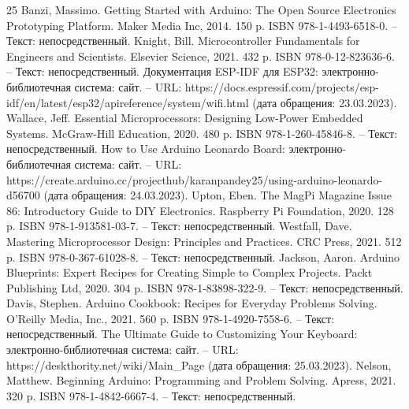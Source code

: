 \begin{thebibliography}{25}
     Banzi, Massimo. Getting Started with Arduino: The Open Source Electronics Prototyping Platform. Maker Media Inc, 2014. 150 p. ISBN 978-1-4493-6518-0. -- Текст: непосредственный.
     Knight, Bill. Microcontroller Fundamentals for Engineers and Scientists. Elsevier Science, 2021. 432 p. ISBN 978-0-12-823636-6. -- Текст: непосредственный.
     Документация ESP-IDF для ESP32: электронно-библиотечная система: сайт. -- URL: https://docs.espressif.com/projects/esp-idf/en/latest/esp32/apireference/system/wifi.html (дата обращения: 23.03.2023).
     Wallace, Jeff. Essential Microprocessors: Designing Low-Power Embedded Systems. McGraw-Hill Education, 2020. 480 p. ISBN 978-1-260-45846-8. -- Текст: непосредственный.
     How to Use Arduino Leonardo Board: электронно-библиотечная система: сайт. -- URL: https://create.arduino.cc/projecthub/karanpandey25/using-arduino-leonardo-d56700 (дата обращения: 24.03.2023).
     Upton, Eben. The MagPi Magazine Issue 86: Introductory Guide to DIY Electronics. Raspberry Pi Foundation, 2020. 128 p. ISBN 978-1-913581-03-7. -- Текст: непосредственный.
     Westfall, Dave. Mastering Microprocessor Design: Principles and Practices. CRC Press, 2021. 512 p. ISBN 978-0-367-61028-8. -- Текст: непосредственный.
     Jackson, Aaron. Arduino Blueprints: Expert Recipes for Creating Simple to Complex Projects. Packt Publishing Ltd, 2020. 304 p. ISBN 978-1-83898-322-9. -- Текст: непосредственный.
     Davis, Stephen. Arduino Cookbook: Recipes for Everyday Problems Solving. O’Reilly Media, Inc., 2021. 560 p. ISBN 978-1-4920-7558-6. -- Текст: непосредственный.
     The Ultimate Guide to Customizing Your Keyboard: электронно-библиотечная система: сайт. -- URL: https://deskthority.net/wiki/Main\_Page (дата обращения: 25.03.2023).
     Nelson, Matthew. Beginning Arduino: Programming and Problem Solving. Apress, 2021. 320 p. ISBN 978-1-4842-6667-4. -- Текст: непосредственный.
    
\end{thebibliography}
